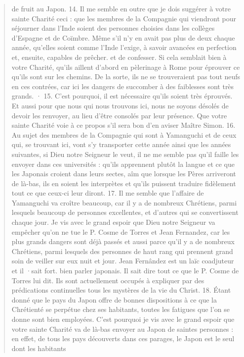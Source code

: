 \begin{quote}
de fruit au Japon.
14. Il me semble en outre que je dois suggérer à votre sainte
Charité ceci : que les membres de la Compagnie qui viendront pour
séjourner dans l'Inde soient des personnes choisies dans les collèges
d'Espagne et de Coïmbre. Même s'il n'y en avait pas plus de
deux chaque année, qu'elles soient comme l'Inde l'exige, à savoir
avancées en perfection et, ensuite, capables de prêcher. et de
confesser. Si cela semblait bien à votre Charité, qu'ils aillent
d'abord en pèlerinage à Rome pour éprouver ce qu'ils sont sur les
chemins. De la sorte, ils ne se trouveraient pas tout neufs en ces
contrées, car ici les dangers de succomber à des faiblesses sont très
grands. ·
15. C'est pourquoi, il est nécessaire qu'ils soient très éprouvés.
Et aussi pour que nous qui nous trouvons ici, nous ne soyons désolés
de devoir les renvoyer, au lieu d'être consolés par leur présence.
Que votre sainte Charité voie à ce propos s'il sera bon d'en aviser
Maître Simon. 
16. Au sujet des membres de la Compagnie qui sont à Yamanguchi
     et de ceux qui, se trouvant ici, vont s'y transporter cette
année ainsi que les années suivantes, si Dieu notre Seigneur le veut,
il ne me semble pas qu'il faille les envoyer dans ces universités :
qu'ils apprennent plutôt la langue et ce que les Japonais croient
dans leurs sectes, aîm que lorsque les Pères arriveront de là-bas,
ils en soient les interprètes et qu'ils puissent traduire fidèlement tout
ce que ceux-ci leur diront.
17. Il me semble que l'affaire de Yamanguchi va croître beaucoup,
car il y a de nombreux Chrétiens, parmi lesquels beaucoup
de personnes excellentes, et d'autres qui se convertissent chaque
jour. Je vis avec le grand espoir que Dieu notre Seigneur va empêcher
qu'on ne tue le P. Cosme de Torres et Jean Fernandez, car
les plus grands dangers sont déjà passés et aussi parce qu'il y a de
nombreux Chrétiens, parmi lesquels des personnes de haut rang qui
prennent grand soin de veiller sur eux nuit et jour. Jean Fernândez
est un laïc coadjuteur et il ·sait fort. bien parler japonais. Il sait
dire tout ce que le P. Cosme de Torres lui dit. Ils sont actuellement
occupés à expliquer par des prédications continuelles tous les
mystères de la vie du Christ.
18. Étant donné que le pays du Japon offre de bonnes dispositions
à ce que la Chrétienté se perpétue chez ses habitants, toutes
les fatigues que l'on se donne sont bien employées. C'est pourquoi
je vis avec le grand espoir que votre sainte Charité va de là-bas
envoyer au Japon de saintes personnes : en effet, de tous les pays
découverts dans ces parages, le Japon est le seul dont les habitants

\end{quote}
